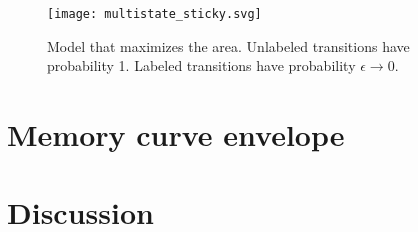 \documentclass{article} %
\begin{document}
\begin{figure}
 \begin{center}
  \texttt{[image: multistate\_sticky.svg]}
 \end{center}
  \caption{Model that maximizes the area. 
  Unlabeled transitions have probability 1. 
  Labeled transitions have probability $\epsilon\to0$.
  }\label{fig:max_area}
\end{figure}



\section{Memory curve envelope}\label{sec:env}





\section{Discussion}\label{sec:disc}










\end{document}
